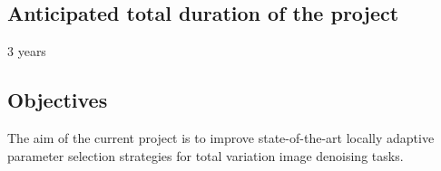 \documentclass[enabledeprecatedfontcommands,cleardoublepage=empty,headsepline,twoside,11pt,DIV=15,BCOR=12mm,final]{scrartcl}
\newcommand{\newf}[1]{}%
\begin{document}
%


\subsection{Anticipated total duration of the project}
\label{sec:duration}

3 years

\subsection{Objectives}\label{sec:Objectives}

The aim of the current project is to improve state-of-the-art locally adaptive parameter selection strategies for total variation image denoising tasks. 
\end{document}

